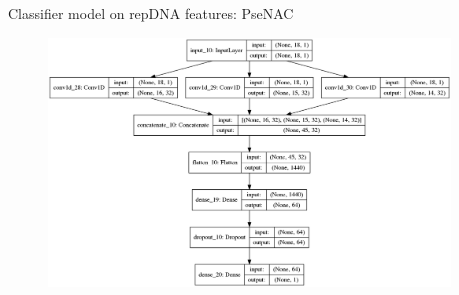 \documentclass[10pt]{beamer}
\begin{document}
\begin{frame}{Classifier model on repDNA features: PseNAC}
	\begin{figure}[ht]
		\centering
		\includegraphics[width = 0.95\textwidth]{../../models/plotted_models/PC_PseDNC_model.png}
	\end{figure}
\end{frame}
\end{document}

